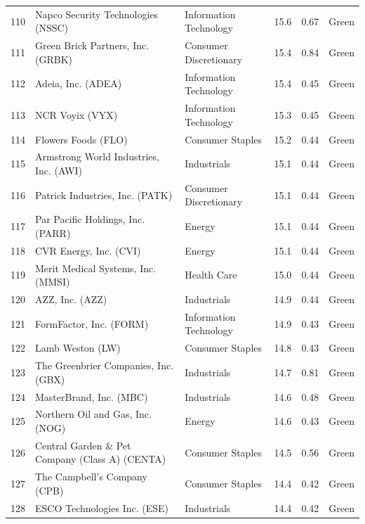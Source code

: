 \documentclass[11pt,a4paper]{article}
\begin{document}
{\begin{longtable}{r p{4.6cm} p{3cm} r r l}
110 & Napco Security Technologies (NSSC) & Information Technology & 15.6 & 0.67 & \cellcolor[HTML]{C6EFCE}Green \\
111 & Green Brick Partners, Inc. (GRBK) & Consumer Discretionary & 15.4 & 0.84 & \cellcolor[HTML]{C6EFCE}Green \\
112 & Adeia, Inc. (ADEA) & Information Technology & 15.4 & 0.45 & \cellcolor[HTML]{C6EFCE}Green \\
113 & NCR Voyix (VYX) & Information Technology & 15.3 & 0.45 & \cellcolor[HTML]{C6EFCE}Green \\
114 & Flowers Foods (FLO) & Consumer Staples & 15.2 & 0.44 & \cellcolor[HTML]{C6EFCE}Green \\
115 & Armstrong World Industries, Inc. (AWI) & Industrials & 15.1 & 0.44 & \cellcolor[HTML]{C6EFCE}Green \\
116 & Patrick Industries, Inc. (PATK) & Consumer Discretionary & 15.1 & 0.44 & \cellcolor[HTML]{C6EFCE}Green \\
117 & Par Pacific Holdings, Inc. (PARR) & Energy & 15.1 & 0.44 & \cellcolor[HTML]{C6EFCE}Green \\
118 & CVR Energy, Inc. (CVI) & Energy & 15.1 & 0.44 & \cellcolor[HTML]{C6EFCE}Green \\
119 & Merit Medical Systems, Inc. (MMSI) & Health Care & 15.0 & 0.44 & \cellcolor[HTML]{C6EFCE}Green \\
120 & AZZ, Inc. (AZZ) & Industrials & 14.9 & 0.44 & \cellcolor[HTML]{C6EFCE}Green \\
121 & FormFactor, Inc. (FORM) & Information Technology & 14.9 & 0.43 & \cellcolor[HTML]{C6EFCE}Green \\
122 & Lamb Weston (LW) & Consumer Staples & 14.8 & 0.43 & \cellcolor[HTML]{C6EFCE}Green \\
123 & The Greenbrier Companies, Inc. (GBX) & Industrials & 14.7 & 0.81 & \cellcolor[HTML]{C6EFCE}Green \\
124 & MasterBrand, Inc. (MBC) & Industrials & 14.6 & 0.48 & \cellcolor[HTML]{C6EFCE}Green \\
125 & Northern Oil and Gas, Inc. (NOG) & Energy & 14.6 & 0.43 & \cellcolor[HTML]{C6EFCE}Green \\
126 & Central Garden \& Pet Company (Class A) (CENTA) & Consumer Staples & 14.5 & 0.56 & \cellcolor[HTML]{C6EFCE}Green \\
127 & The Campbell's Company (CPB) & Consumer Staples & 14.4 & 0.42 & \cellcolor[HTML]{C6EFCE}Green \\
128 & ESCO Technologies Inc. (ESE) & Industrials & 14.4 & 0.42 & \cellcolor[HTML]{C6EFCE}Green \\

\end{longtable}}
\end{document}

